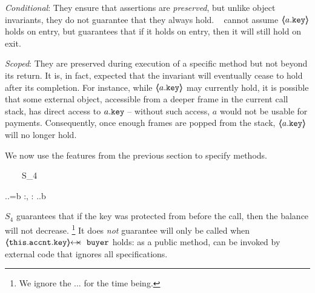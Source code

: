  \begin{customquote}
\noindent
\emph{Conditional}:   They ensure that assertions are \emph{preserved}, but unlike object invariants, they do not guarantee that they always hold.
\ \Eg   {} cannot assume $\langle\!\!\langle a.\mbox{\normalfont{\texttt{key}}} \rangle\!\!\rangle$ holds on entry, but   guarantees that if it holds on entry, then  it will still hold on exit.

\noindent
\emph{Scoped}:  %
They are preserved during  execution of a specific method but not beyond its return. It is, in fact, expected that the invariant will eventually cease to hold after its completion. For instance, while $\langle\!\!\langle a.\mbox{\normalfont{\texttt{key}}} \rangle\!\!\rangle$ may currently hold, it is possible that some external object, accessible from a deeper frame in the current call stack, has direct access to $a.\mbox{\normalfont{\texttt{key}}}$ -- without such access, $a$ would not be usable for payments. Consequently, once enough frames are popped from the stack, $\langle\!\!\langle a.\mbox{\normalfont{\texttt{key}}} \rangle\!\!\rangle$  will no longer hold.


 \end{customquote}
 
 \begin{example}
 We   now use the features from the previous section to specify methods. 

{\sprepostShort
		{\strut \ \ \ \ S_4} 
		{    {} \wedge {}.\prg{\myAccount}.\prg{\balance}=b
		 }
		{} {} {:, : }
		{ 
		  .\prg{\myAccount}.\prg{\balance}\geq b
		} 
		}

\noindent
$S_4$  guarantees that if the  key was protected from  before the call, then the balance will not decrease. 
\footnote{We ignore the ... for the time being.}
 It does \emph{not} guarantee  will only be called when $\protectedFrom{\prg{this}.\prg{\myAccount}.\prg{key}} {\prg{buyer}}$ holds: 
as a  public method,    can be invoked by external code that ignores all specifications.
\end{example}

